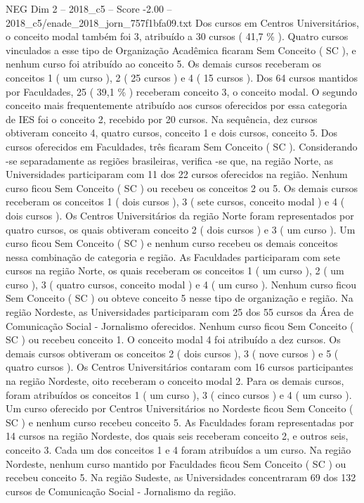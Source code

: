 \begin{textsample}{NEG Dim 2 – 2018\_c5 – Score -2.00 – 2018\_c5/enade\_2018\_jorn\_757f1bfa09.txt}
Dos cursos em Centros Universitários, o conceito modal também foi 3, atribuído a 30 cursos ( 41,7 \% ).
Quatro cursos vinculados a esse tipo de Organização Acadêmica ficaram Sem Conceito ( SC ), e nenhum curso foi atribuído ao conceito 5.
Os demais cursos receberam os conceitos 1 ( um curso ), 2 ( 25 cursos ) e 4 ( 15 cursos ).
Dos 64 cursos mantidos por Faculdades, 25 ( 39,1 \% ) receberam conceito 3, o conceito modal.
O segundo conceito mais frequentemente atribuído aos cursos oferecidos por essa categoria de IES foi o conceito 2, recebido por 20 cursos.
Na sequência, dez cursos obtiveram conceito 4, quatro cursos, conceito 1 e dois cursos, conceito 5.
Dos cursos oferecidos em Faculdades, três ficaram Sem Conceito ( SC ).
Considerando -se separadamente as regiões brasileiras, verifica -se que, na região Norte, as Universidades participaram com 11 dos 22 cursos oferecidos na região.
Nenhum curso ficou Sem Conceito ( SC ) ou recebeu os conceitos 2 ou 5.
Os demais cursos receberam os conceitos 1 ( dois cursos ), 3 ( sete cursos, conceito modal ) e 4 ( dois cursos ).
Os Centros Universitários da região Norte foram representados por quatro cursos, os quais obtiveram conceito 2 ( dois cursos ) e 3 ( um curso ).
Um curso ficou Sem Conceito ( SC ) e nenhum curso recebeu os demais conceitos nessa combinação de categoria e região.
As Faculdades participaram com sete cursos na região Norte, os quais receberam os conceitos 1 ( um curso ), 2 ( um curso ), 3 ( quatro cursos, conceito modal ) e 4 ( um curso ).
Nenhum curso ficou Sem Conceito ( SC ) ou obteve conceito 5 nesse tipo de organização e região.
Na região Nordeste, as Universidades participaram com 25 dos 55 cursos da Área de Comunicação Social - Jornalismo oferecidos.
Nenhum curso ficou Sem Conceito ( SC ) ou recebeu conceito 1.
O conceito modal 4 foi atribuído a dez cursos.
Os demais cursos obtiveram os conceitos 2 ( dois cursos ), 3 ( nove cursos ) e 5 ( quatro cursos ).
Os Centros Universitários contaram com 16 cursos participantes na região Nordeste, oito receberam o conceito modal 2.
Para os demais cursos, foram atribuídos os conceitos 1 ( um curso ), 3 ( cinco cursos ) e 4 ( um curso ).
Um curso oferecido por Centros Universitários no Nordeste ficou Sem Conceito ( SC ) e nenhum curso recebeu conceito 5.
As Faculdades foram representadas por 14 cursos na região Nordeste, dos quais seis receberam conceito 2, e outros seis, conceito 3.
Cada um dos conceitos 1 e 4 foram atribuídos a um curso.
Na região Nordeste, nenhum curso mantido por Faculdades ficou Sem Conceito ( SC ) ou recebeu conceito 5.
Na região Sudeste, as Universidades concentraram 69 dos 132 cursos de Comunicação Social - Jornalismo da região.

\end{textsample}
